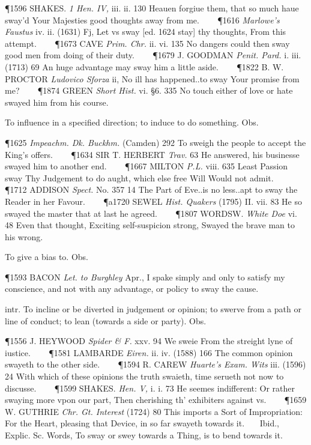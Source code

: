 \begin{description}[wide, labelwidth=!, labelindent=0pt]
\begin{myenumerate}
\P 1596 SHAKES.  \textit{1 Hen. IV,} iii. ii. 130 Heauen forgiue them, that so much haue sway'd Your Majesties good thoughts away from me.    
\P 1616 \textit{Marlowe's  Faustus} iv. ii. (1631) Fj, Let vs sway [ed. 1624 stay]  thy thoughts, From this attempt.    
\P 1673 CAVE  \textit{Prim. Chr.} ii. vi. 135 No dangers could then sway good men from doing of their duty.    
\P 1679 J. GOODMAN  \textit{Penit. Pard.} i. iii. (1713) 69 An huge advantage may sway him a little aside.    
\P 1822 B. W. PROCTOR  \textit{Ludovico Sforza} ii, No ill has happened..to sway Your promise from me?    
\P 1874 GREEN  \textit{Short Hist.} vi. §6. 335 No touch either of love or hate swayed him from his course.

 To influence in a specified direction; to induce to do something. Obs.

\P 1625 \textit{Impeachm.  Dk. Buckhm.} (Camden) 292 To sweigh the people to accept the King's offers.    
\P 1634 SIR T. HERBERT  \textit{Trav.} 63 He answered, his businesse swayed him to another end.    
\P 1667 MILTON  \textit{P.L.} viii. 635 Least Passion sway Thy Judgement to do aught, which else free Will Would not admit.    
\P 1712 ADDISON  \textit{Spect.} No. 357 14 The Part of Eve..is no less..apt to sway the Reader in her Favour.    
\P a1720 SEWEL  \textit{Hist. Quakers} (1795) II. vii. 83 He so swayed the master that at last he agreed.    
\P 1807 WORDSW.  \textit{White Doe} vi. 48 Even that thought, Exciting self-suspicion strong, Swayed the brave man to his wrong.

 To give a bias to. Obs.

\P 1593 BACON  \textit{Let. to Burghley} Apr., I spake simply and only to satisfy my conscience, and not with any advantage, or policy to sway the cause.

 intr. To incline or be diverted in judgement or opinion; to swerve from a path or line of conduct; to lean (towards a side or party). Obs.

\P 1556 J. HEYWOOD  \textit{Spider \& F.} xxv. 94 We sweie From the streight lyne of iustice.    
\P 1581 LAMBARDE  \textit{Eiren.} ii. iv. (1588) 166 The common opinion swayeth to the other side.    
\P 1594 R. CAREW  \textit{Huarte's Exam. Wits} iii. (1596) 24 With which of these opinions the truth swaieth, time serueth not now to discusse.    
\P 1599 SHAKES.  \textit{Hen. V,} i. i. 73 He seemes indifferent: Or rather swaying more vpon our part, Then cherishing th' exhibiters against vs.    
\P 1659 W. GUTHRIE  \textit{Chr. Gt. Interest} (1724) 80 This imports a Sort of Impropriation: For the Heart, pleasing that Device, in so far swayeth towards it.    Ibid., Explic. Sc. Words, To sway or swey towards a Thing, is to bend towards it.


\end{myenumerate}
\end{description}
